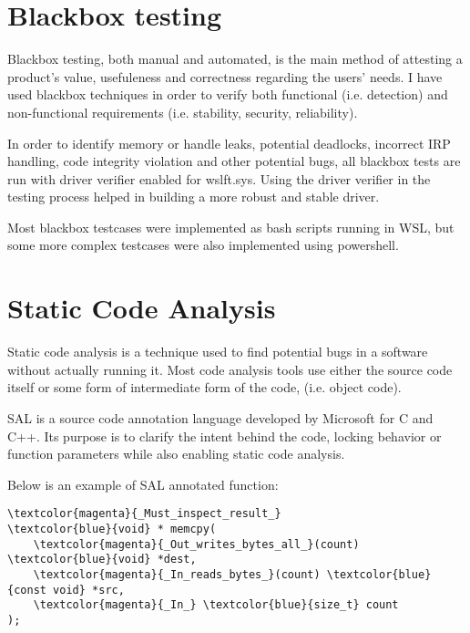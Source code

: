     \pagebreak

    \section{Blackbox testing}
        Blackbox testing, both manual and automated, is the main method of attesting a product's value, usefuleness and correctness regarding
        the users' needs. I have used blackbox techniques in order to verify both functional (i.e. detection) and non-functional requirements
        (i.e. stability, security, reliability).

        In order to identify memory or handle leaks, potential deadlocks, incorrect IRP handling, code integrity violation and other potential
        bugs, all blackbox tests are run with driver verifier enabled for wslft.sys. Using the driver verifier in the testing process helped
        in building a more robust and stable driver.

        Most blackbox testcases were implemented as bash scripts running in WSL, but some more complex testcases were also implemented
        using powershell.

    \section{Static Code Analysis}
        Static code analysis is a technique used to find potential bugs in a software without actually running it. Most code analysis tools use
        either the source code itself or some form of intermediate form of the code, (i.e. object code).

        SAL is a source code annotation language developed by Microsoft for C and C++. Its purpose is to clarify the intent behind the code,
        locking behavior or function parameters while also enabling static code analysis.

        Below is an example of SAL annotated function:

    \begin{Verbatim}[fontsize=\small, commandchars=\\\{\}]
\textcolor{magenta}{_Must_inspect_result_}
\textcolor{blue}{void} * memcpy(  
    \textcolor{magenta}{_Out_writes_bytes_all_}(count) \textcolor{blue}{void} *dest,   
    \textcolor{magenta}{_In_reads_bytes_}(count) \textcolor{blue}{const void} *src,   
    \textcolor{magenta}{_In_} \textcolor{blue}{size_t} count  
);  
    \end{Verbatim}

